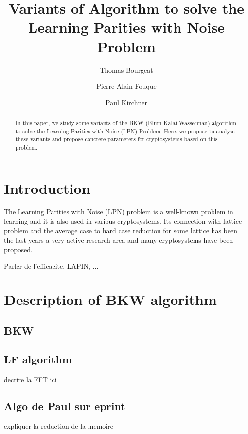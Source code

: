 \documentclass{llncs}		%
\begin{document}
\title{Variants of Algorithm to solve the Learning Parities with Noise Problem}
\author{Thomas Bourgeat \and Pierre-Alain Fouque \and Paul Kirchner}

\maketitle

\begin{abstract}
In this paper, we study some variants of the BKW (Blum-Kalai-Wasserman) algorithm to solve the Learning Parities with Noise (LPN) Problem. Here, we propose to analyse these variants and propose concrete parameters for cryptosystems based on this problem. 
\end{abstract}

\section{Introduction}
The Learning Parities with Noise (LPN) problem is a well-known problem in learning and it is also used in various cryptosystems. Its connection with lattice problem and the average case to hard case reduction for some lattice has been the last years a very active research area and many cryptosystems have been proposed. 

Parler de l'efficacite, LAPIN, ... 

\section{Description of BKW algorithm}

\subsection{BKW}

\subsection{LF algorithm}

decrire la FFT ici

\subsection{Algo de Paul sur eprint}
expliquer la reduction de la memoire
\end{document}
